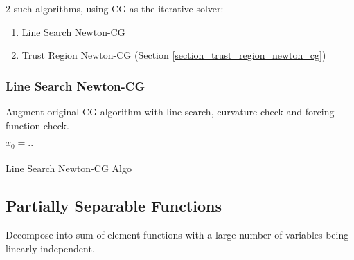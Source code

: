 \documentclass[8pt,letter]{article}
\begin{document}
\begin{multicols*}{2}
  2 such algorithms, using CG as the iterative solver:
  \begin{enumerate}
  \item Line Search Newton-CG
  \item Trust Region Newton-CG (Section \ref{section_trust_region_newton_cg})
  \end{enumerate}

  \subsubsection{Line Search Newton-CG}
  Augment original CG algorithm with line search, curvature check and forcing function check.\\
    
  \begin{algorithm}[H]
    $x_0 = ..$\\
    \\
    \caption{Line Search Newton-CG Algo \label{Algo_line_search_newton_cg}}
  \end{algorithm}

  \subsection{Partially Separable Functions}
  Decompose into sum of element functions with a large number of variables being linearly independent.\\


\end{multicols*}
\end{document}
